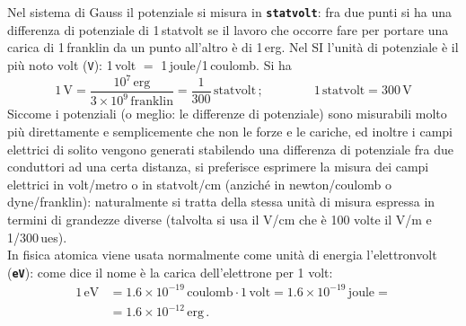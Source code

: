 Nel sistema di Gauss il potenziale si misura in \texttt{\textbf{statvolt}}: fra
due punti si ha una differenza di potenziale di 1\,statvolt se il lavoro che
occorre fare per portare una carica di 1\,franklin da un punto all'altro \`e di
1\,erg. Nel SI l'unit\`a di potenziale \`e il pi\`u noto volt (\texttt{V}):
1\,volt $=$ 1\,joule/1\,coulomb. Si ha
\begin{equation}
  1\,\mathrm{V}=\frac{10^7\,\mathrm{erg}}{3\times10^9\,\mathrm{franklin}}
  =\frac{1}{300}\,\mathrm{statvolt}\,;
  \qquad\qquad1\,\mathrm{statvolt}=300\,\mathrm{V}
  \tag{1.67}
\end{equation}
Siccome i potenziali (o meglio: le differenze di potenziale) sono misurabili
molto pi\`u direttamente e semplicemente che non le forze e le cariche, ed
inoltre i campi elettrici di solito vengono generati stabilendo una differenza
di potenziale fra due conduttori ad una certa distanza, si preferisce esprimere
la misura dei campi elettrici in volt/metro o in statvolt/cm (anzich\'e in
newton/coulomb o dyne/franklin): naturalmente si tratta della stessa unit\`a di
misura espressa in termini di grandezze diverse (talvolta si usa il V/cm che \`e
100 volte il V/m e 1/300\,ues).\\
In fisica atomica viene usata normalmente come unit\`a di energia l'elettronvolt
(\texttt{\textbf{eV}}): come dice il nome \`e la carica dell'elettrone per 1
volt:
\begin{equation}
  \begin{split}
    1\,\mathrm{eV}&=1.6\times10^{-19}\,\mathrm{coulomb}\cdot1\,\mathrm{volt}
    =1.6\times10^{-19}\,\mathrm{joule}=\\
    &=1.6\times10^{-12}\,\mathrm{erg}\,.
  \end{split}
  \tag{1.68}
\end{equation}

